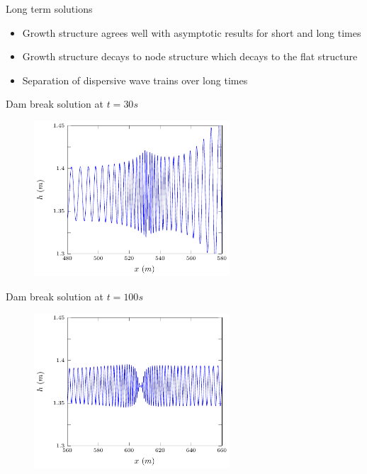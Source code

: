 \documentclass[pdf]{beamer}
\begin{document}
\begin{frame}{Long term solutions}
	\begin{itemize}
		\item Growth structure agrees well with asymptotic results for short and long times
		\item Growth structure decays to node structure which decays to the flat structure
		\item Separation of dispersive wave trains over long times
	\end{itemize}
\end{frame}

\begin{frame}{Dam break solution at $t=30s$}
		\begin{figure}
			\includegraphics[width=0.65\textwidth]{./Pictures/Results/Example/G30.pdf}
		\end{figure}

\end{frame}

\begin{frame}{Dam break solution at $t=100s$}
	\begin{figure}
		\includegraphics[width=0.65\textwidth]{./Pictures/Results/Example/N100.pdf}
	\end{figure}
	
\end{frame}
\end{document}
